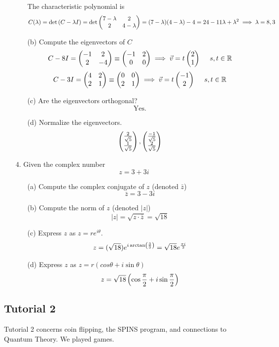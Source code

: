 \documentclass[english, 11pt]{article}
\begin{document}
\begin{itemize}
\begin{itemize}
           The characteristic polynomial is
           \[ C(\lambda) = \det{(C - \lambda I)} = \det \left(\begin{matrix}7 - \lambda & 2 \\ 2 & 4 - \lambda\end{matrix}\right) = (7-\lambda)(4-\lambda) - 4  = 24 -11\lambda + \lambda^2 \implies \lambda = 8, 3 \]
         \item[(b)] Compute the eigenvectors of $C$
           \[ C - 8I = \mtx{-1 & 2 \\ 2 & -4 } \equiv \mtx{-1 & 2 \\ 0 & 0} \implies \vv = t\mtx{2 \\ 1} \ \ \ \ s, t \in \R\]
           \[ C - 3I = \left(\begin{matrix}4 & 2 \\ 2 & 1 \end{matrix}\right) \equiv \left(\begin{matrix}0 & 0 \\ 2 & 1\end{matrix}\right) \implies {\vec{v}} = t\left(\begin{matrix}-1 \\ 2\end{matrix}\right) \ \ \ \ s, t \in {\mathbb{R}}\]
         \item[(c)] Are the eigenvectors orthogonal?
         \[ \mbox{Yes.} \]
         \item[(d)] Normalize the eigenvectors.
         \[ \left(\begin{matrix}\frac{2}{\sqrt{5}} \\ \frac{1}{\sqrt{5}}\end{matrix}\right), \left(\begin{matrix}\frac{-1}{\sqrt{5}} \\ \frac{2}{\sqrt{5}}\end{matrix}\right) \]
       \end{itemize}
       \item[4.] Given the complex number
       \[ z = 3 + 3i \]
       \begin{itemize}
         \item[(a)] Compute the complex conjugate of $z$ (denoted $\bar{z}$)
            \[ \bar{z} = 3 - 3i \]
         \item[(b)] Compute the norm of $z$ (denoted $|z|$)
            \[ |z| = \sqrt{z\cdot \bar{z}} = \sqrt{18} \]
         \item[(c)] Express $z$ as $z = re^{i\theta}$.
            \[ z = (\sqrt{18})e^{i\arctan\left( \frac{3}{3} \right)} = \sqrt{18}e^{\frac{\pi i}{2}} \]
         \item[(d)] Express $z$ as $z = r(cos\theta + i\sin\theta)$
             \[ z = \sqrt{18}\left(\cos \frac{\pi}{2} + i\sin \frac{\pi}{2}\right) \]
       \end{itemize}
     \end{itemize}

     \subsection{Tutorial 2}

      Tutorial 2 concerns coin flipping, the SPINS program, and connections to Quantum Theory. We played games.
\end{document}

